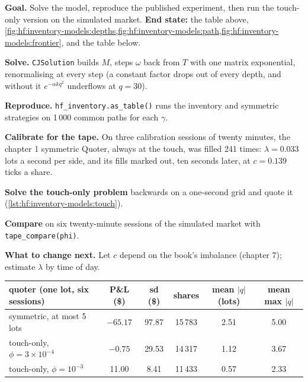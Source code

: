 \begin{tutorial}
\textbf{Goal.} Solve the model, reproduce the published experiment, then run the touch-only version on the simulated market. \textbf{End state:} the
table above, \cref{fig:hf:inventory-models:depths,fig:hf:inventory-models:path,fig:hf:inventory-models:frontier}, and the table below.
\begin{tutsteps}
\item \textbf{Solve.} \texttt{CJSolution} builds $M$, steps $\omega$ back from $T$ with one matrix exponential, renormalising at every step (a
constant factor drops out of every depth, and without it $e^{-\alpha kq^2}$ underflows at $q=30$).
\label{lst:hf:inventory-models:cj}
\item \textbf{Reproduce.} \texttt{hf\_inventory.as\_table()} runs the inventory and symmetric strategies on 1\,000 common paths for each $\gamma$.
\item \textbf{Calibrate for the tape.} On three calibration sessions of twenty minutes, the chapter 1 symmetric Quoter, always at the touch, was
filled 241 times: $\lambda=0.033$ lots a second per side, and its fills marked out, ten seconds later, at $c=0.139$ ticks a share.
\item \textbf{Solve the touch-only problem} backwards on a one-second grid and quote it (\cref{lst:hf:inventory-models:touch}).
\label{lst:hf:inventory-models:touch}
\item \textbf{Compare} on six twenty-minute sessions of the simulated market with \texttt{tape\_compare(phi)}.
\end{tutsteps}
\textbf{What to change next.} Let $c$ depend on the book's imbalance (chapter 7); estimate $\lambda$ by time of day.
\end{tutorial}

\begin{center}
\small
\begin{tabular}{@{}lccccc@{}}
\toprule
quoter (one lot, six sessions) & P\&L (\$) & sd (\$) & shares & mean $|q|$ (lots) & mean max $|q|$\\
\midrule
symmetric, at most 5 lots & $-65.17$ & 97.87 & 15\,783 & 2.51 & 5.00\\
touch-only, $\phi=3\times10^{-4}$ & $-0.75$ & 29.53 & 14\,317 & 1.12 & 3.67\\
touch-only, $\phi=10^{-3}$ & 11.00 & 8.41 & 11\,433 & 0.57 & 2.33\\
\bottomrule
\end{tabular}
\end{center}

